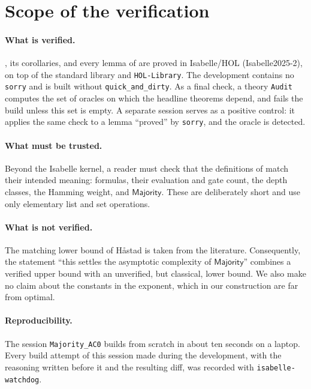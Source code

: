 \documentclass[11pt]{article}
\newcommand{\isa}[1]{\texttt{#1}}
\newcommand{\Majority}{\mathsf{Majority}}
\begin{document}
\section{Scope of the verification}
\label{sec:trust}

\paragraph{What is verified.} , its corollaries, and every lemma of  are proved in Isabelle/HOL (Isabelle2025-2), on top of the standard library and \isa{HOL-Library}. The development contains no \isa{sorry} and is built without \isa{quick\_and\_dirty}. As a final check, a theory \isa{Audit} computes the set of oracles on which the headline theorems depend, and fails the build unless this set is empty. A separate session serves as a positive control: it applies the same check to a lemma ``proved'' by \isa{sorry}, and the oracle is detected.

\paragraph{What must be trusted.} Beyond the Isabelle kernel, a reader must check that the definitions of  match their intended meaning: formulas, their evaluation and gate count, the depth classes, the Hamming weight, and $\Majority$. These are deliberately short and use only elementary list and set operations.

\paragraph{What is not verified.} The matching lower bound of H{\aa}stad is taken from the literature. Consequently, the statement ``this settles the asymptotic complexity of $\Majority$'' combines a verified upper bound with an unverified, but classical, lower bound. We also make no claim about the constants in the exponent, which in our construction are far from optimal.

\paragraph{Reproducibility.} The session \isa{Majority\_AC0} builds from scratch in about ten seconds on a laptop. Every build attempt of this session made during the development, with the reasoning written before it and the resulting diff, was recorded with \isa{isabelle-watchdog}.
\end{document}
